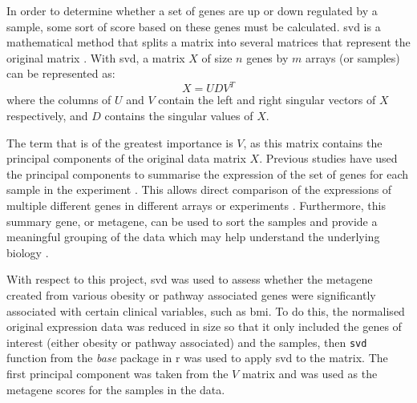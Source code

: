In order to determine whether a set of genes are up or down regulated by a sample, some sort of score based on these genes must be calculated.
\Gls{svd} is a mathematical method that splits a matrix into several matrices that represent the original matrix \citep{Golub1970}.
With \gls{svd}, a matrix $X$ of size $n$ genes by $m$ arrays (or samples) can be represented as:
\begin{equation}
	\label{eq:svd}
	X = UDV^T
\end{equation}
where the columns of $U$ and $V$ contain the left and right singular vectors of $X$ respectively, and $D$ contains the singular values of $X$.

The term that is of the greatest importance is $V$, as this matrix contains the principal components of the original data matrix $X$.
Previous studies have used the principal components to summarise the expression of the set of genes for each sample in the experiment \citep{Alter2000,West2001}.
This allows direct comparison of the expressions of multiple different genes in different arrays or experiments \citep{Alter2000}.
Furthermore, this summary gene, or metagene, can be used to sort the samples and provide a meaningful grouping of the data which may help understand the underlying biology \citep{Alter2000}.

With respect to this project, \gls{svd} was used to assess whether the metagene created from various obesity or pathway associated genes were significantly associated with certain clinical variables, such as \gls{bmi}.
To do this, the normalised original expression data was reduced in size so that it only included the genes of interest (either obesity or pathway associated) and the samples, then \texttt{svd} function from the \textit{base} package in \gls{r} was used to apply \gls{svd} to the matrix.
The first principal component was taken from the $V$ matrix and was used as the metagene scores for the samples in the data.

